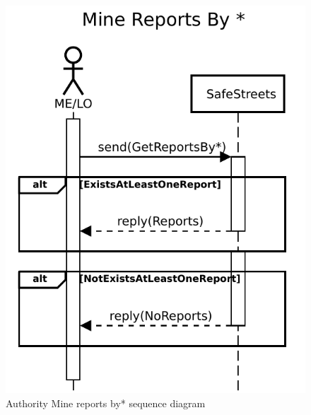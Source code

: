 						\begin{figure}[!h]
								\centering
							\includegraphics[height=0.4\textheight] {images/SequenceDiagram/Authority/MineReportsBy.pdf}
								\caption{Authority Mine reports by* sequence diagram}
						\end{figure}

